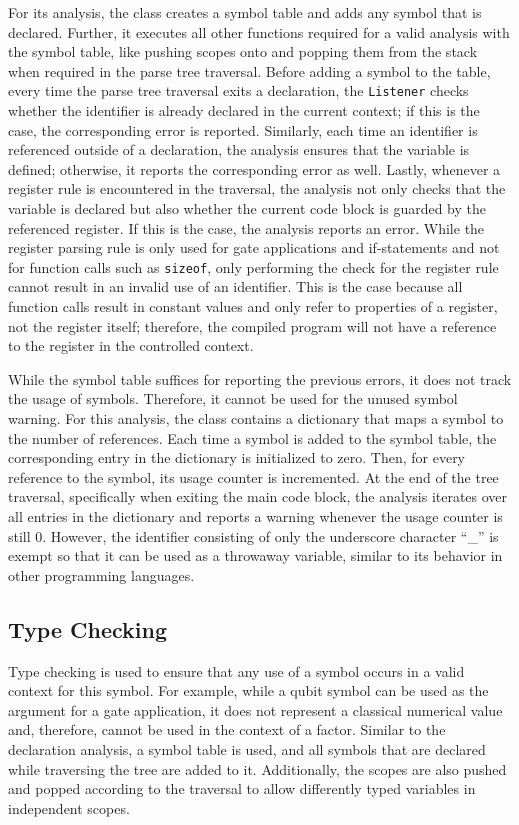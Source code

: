 For its analysis, the class creates a symbol table and adds any symbol that is declared. Further, it executes all other functions required for a valid analysis with the symbol table, like pushing scopes onto and popping them from the stack when required in the parse tree traversal. Before adding a symbol to the table, \ie every time the parse tree traversal exits a declaration, the \texttt{Listener} checks whether the identifier is already declared in the current context; if this is the case, the corresponding error is reported. Similarly, each time an identifier is referenced outside of a declaration, the analysis ensures that the variable is defined; otherwise, it reports the corresponding error as well. Lastly, whenever a register rule is encountered in the traversal, the analysis not only checks that the variable is declared but also whether the current code block is guarded by the referenced register. If this is the case, the analysis reports an error. While the register parsing rule is only used for gate applications and if-statements and not for function calls such as \texttt{sizeof}, only performing the check for the register rule cannot result in an invalid use of an identifier. This is the case because all function calls result in constant values and only refer to properties of a register, not the register itself; therefore, the compiled program will not have a reference to the register in the controlled context.

While the symbol table suffices for reporting the previous errors, it does not track the usage of symbols. Therefore, it cannot be used for the unused symbol warning. For this analysis, the class contains a dictionary that maps a symbol to the number of references. Each time a symbol is added to the symbol table, the corresponding entry in the dictionary is initialized to zero. Then, for every reference to the symbol, its usage counter is incremented. At the end of the tree traversal, specifically when exiting the main code block, the analysis iterates over all entries in the dictionary and reports a warning whenever the usage counter is still $0$. However, the identifier consisting of only the underscore character ``\_'' is exempt so that it can be used as a throwaway variable, similar to its behavior in other programming languages.

\subsection{Type Checking}
\label{sec:implementation_typeCheckingAnalayis}
Type checking is used to ensure that any use of a symbol occurs in a valid context for this symbol. For example, while a qubit symbol can be used as the argument for a gate application, it does not represent a classical numerical value and, therefore, cannot be used in the context of a factor. Similar to the declaration analysis, a symbol table is used, and all symbols that are declared while traversing the tree are added to it. Additionally, the scopes are also pushed and popped according to the traversal to allow differently typed variables in independent scopes.

